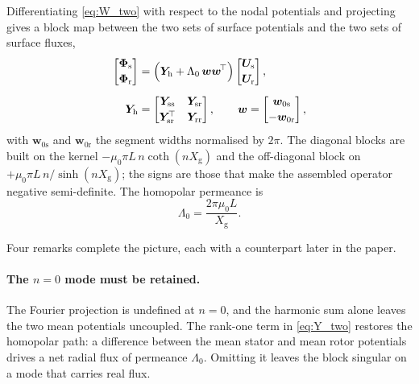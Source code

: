 \documentclass[10pt,a4paper,twocolumn]{article}
\newcommand{\Xg}{X_{\mathrm{g}}}
\theoremstyle{plain}
\theoremstyle{remark}
\begin{document}
Differentiating \eqref{eq:W_two} with respect to the nodal potentials
and projecting gives a block map between the two sets of surface
potentials and the two sets of surface fluxes,
\begin{equation}
\begin{aligned}
\begin{bmatrix}\bm{\Phi}_{\mathrm{s}}\\[2pt]\bm{\Phi}_{\mathrm{r}}\end{bmatrix}
&=\Bigl(\bm{Y}_{\mathrm{h}}+\Lambda_0\,\bm{w}\bm{w}^{\!\top}\Bigr)
\begin{bmatrix}\bm{U}_{\mathrm{s}}\\[2pt]\bm{U}_{\mathrm{r}}\end{bmatrix},\\[4pt]
\bm{Y}_{\mathrm{h}}&=\begin{bmatrix}
\bm{Y}_{\mathrm{ss}} & \bm{Y}_{\mathrm{sr}}\\[2pt]
\bm{Y}_{\mathrm{sr}}^{\!\top} & \bm{Y}_{\mathrm{rr}}\end{bmatrix},
\qquad
\bm{w}=\begin{bmatrix}\bm{w}_{0\mathrm{s}}\\[2pt]-\bm{w}_{0\mathrm{r}}\end{bmatrix},
\end{aligned}
\label{eq:Y_two}
\end{equation}
with $\bm{w}_{0\mathrm{s}}$ and $\bm{w}_{0\mathrm{r}}$ the segment
widths normalised by $2\pi$. The diagonal blocks are built on the kernel
$-\mu_0\pi L\,n\coth(n\Xg)$ and the off-diagonal block on
$+\mu_0\pi L\,n/\sinh(n\Xg)$; the signs are those that make the
assembled operator negative semi-definite. The homopolar permeance is
\begin{equation}
\Lambda_0=\frac{2\pi\mu_0 L}{\Xg} .
\label{eq:Lam0}
\end{equation}

Four remarks complete the picture, each with a counterpart later in the
paper.

\paragraph{The $n=0$ mode must be retained.}
The Fourier projection is undefined at $n=0$, and the harmonic sum alone
leaves the two mean potentials uncoupled. The rank-one term in
\eqref{eq:Y_two} restores the homopolar path: a difference between the
mean stator and mean rotor potentials drives a net radial flux of
permeance $\Lambda_0$. Omitting it leaves the block singular on a mode
that carries real flux.
\end{document}
